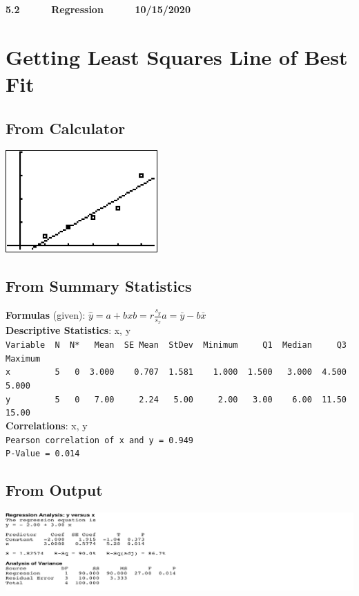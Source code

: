 \documentclass[10pt]{report}
\begin{document}
  \begin{center}
   {\bf \Large 5.2 ~ ~ ~ Regression ~ ~ ~ 10/15/2020}\\[.5in]
 \end{center}

\setcounter{chapter}{5}
\setcounter{section}{1}

\section{Getting Least Squares Line of Best Fit} %
\label{}
\subsection{From Calculator}
	\includegraphics[width=.15\textwidth]{img/5_scat}

\subsection{From Summary Statistics} %
\label{sub:from_summary_statistics}
{\bf Formulas} (given): $\hat{y} = a + bx$\quad\quad$b = r\frac{s_y}{s_x}$\quad\quad$a=\bar{y}-b\bar{x}$\\[.2in]
{\bf Descriptive Statistics}: x, y\\  
\verb|Variable  N  N*   Mean  SE Mean  StDev  Minimum     Q1  Median     Q3  Maximum|\\
\verb|x         5   0  3.000    0.707  1.581    1.000  1.500   3.000  4.500    5.000|\\
\verb|y         5   0   7.00     2.24   5.00     2.00   3.00    6.00  11.50    15.00|\\[.1in]
{\bf Correlations}: x, y \\
\verb|Pearson correlation of x and y = 0.949|\\
\verb|P-Value = 0.014|\\[.5in]


\subsection{From Output} %
\label{sub:from_output}
\includegraphics[width=1\textwidth]{img/5_RegOut}\\[.25in]
\end{document}
